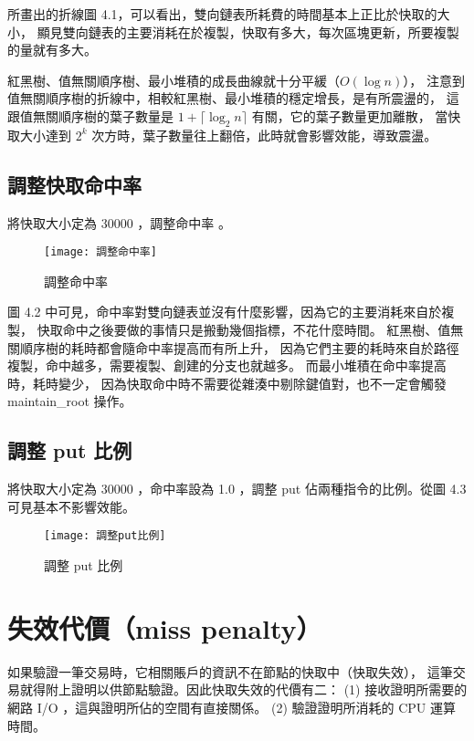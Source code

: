 所畫出的折線圖 4.1，可以看出，雙向鏈表所耗費的時間基本上正比於快取的大小，
顯見雙向鏈表的主要消耗在於複製，快取有多大，每次區塊更新，所要複製的量就有多大。

紅黑樹、值無關順序樹、最小堆積的成長曲線就十分平緩（$O(\log n)$），
注意到值無關順序樹的折線中，相較紅黑樹、最小堆積的穩定增長，是有所震盪的，
這跟值無關順序樹的葉子數量是 $1 + \lceil \log_2 n \rceil$ 有關，它的葉子數量更加離散，
當快取大小達到 $2^k$ 次方時，葉子數量往上翻倍，此時就會影響效能，導致震盪。

\subsection{調整快取命中率}

將快取大小定為 30000 ，調整命中率 。

\begin{figure}[h!]
\texttt{[image: 調整命中率]}
\caption{調整命中率}
\end{figure}

圖 4.2 中可見，命中率對雙向鏈表並沒有什麼影響，因為它的主要消耗來自於複製，
快取命中之後要做的事情只是搬動幾個指標，不花什麼時間。
紅黑樹、值無關順序樹的耗時都會隨命中率提高而有所上升，
因為它們主要的耗時來自於路徑複製，命中越多，需要複製、創建的分支也就越多。
而最小堆積在命中率提高時，耗時變少，
因為快取命中時不需要從雜湊中剔除鍵值對，也不一定會觸發 maintain\_root 操作。

\subsection{調整 put 比例}

將快取大小定為 30000 ，命中率設為 1.0 ，調整 put 佔兩種指令的比例。從圖 4.3 可見基本不影響效能。

\begin{figure}[h!]
\texttt{[image: 調整put比例]}
\caption{調整 put 比例}
\end{figure}


\section{失效代價（miss penalty）}

如果驗證一筆交易時，它相關賬戶的資訊不在節點的快取中（快取失效），
這筆交易就得附上證明以供節點驗證。因此快取失效的代價有二：
(1) 接收證明所需要的網路 I/O ，這與證明所佔的空間有直接關係。
(2) 驗證證明所消耗的 CPU 運算時間。

